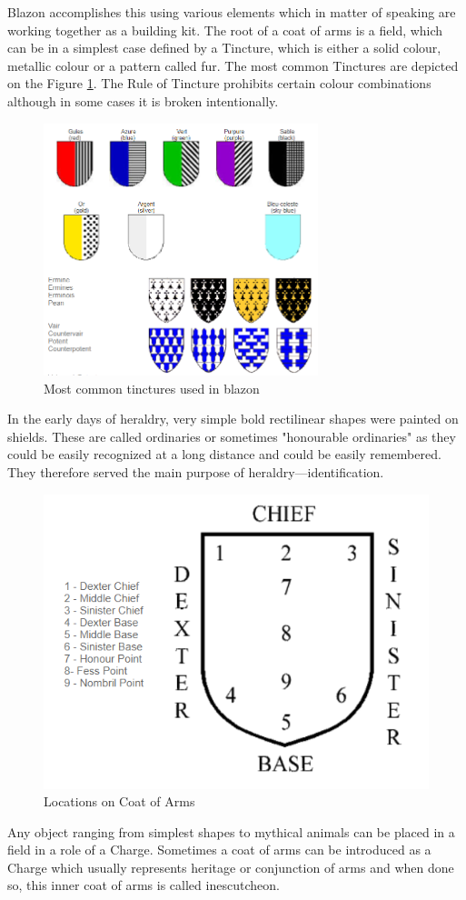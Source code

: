 \documentclass[12pt,a4paper]{article}
\begin{document}
Blazon accomplishes this using various elements which in matter of speaking are working together as a building kit. The root of a coat of arms is a field, which can be in a simplest case defined by a Tincture, which is either a solid colour, metallic colour or a pattern called fur. The most common Tinctures are depicted on the Figure \ref{tinctures}. The Rule of Tincture prohibits certain colour combinations although in some cases it is broken intentionally.
\begin{figure}[h]
	\centering
	\includegraphics[width=80mm]{img/tinctures.png}
	\caption{Most common tinctures used in blazon \cite{InternationalHeraldry}}
	\label{tinctures}
\end{figure}

In the early days of heraldry, very simple bold rectilinear shapes were painted on shields. These are called ordinaries or sometimes "honourable ordinaries" as they could be easily recognized at a long distance and could be easily remembered.
They therefore served the main purpose of heraldry—identification. \cite{InternationalHeraldry}

\begin{figure}
	\centering
	\includegraphics[width=0.5\linewidth]{img/locations}
	\caption{Locations on Coat of Arms}
	\label{fig:locations}
\end{figure}
Any object ranging from simplest shapes to mythical animals can be placed in a field in a role of a Charge.
Sometimes a coat of arms can be introduced as a Charge which usually represents heritage or conjunction of arms and when done so, this inner coat of arms is called inescutcheon.
\pagebreak
\end{document}
